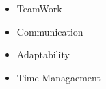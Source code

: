 \documentclass[a4paper,12pt]{article}
\begin{document}
\begin{minipage}[t]{0.5\textwidth}
    \begin{itemize}
        \item TeamWork
    \end{itemize}
\end{minipage}
\begin{minipage}[t]{0.5\textwidth}
    \begin{itemize}
        \item Communication
    \end{itemize}
\end{minipage}

\begin{minipage}[t]{0.5\textwidth}
    \begin{itemize}
        \item Adaptability
    \end{itemize}
\end{minipage}
\begin{minipage}[t]{0.5\textwidth}
    \begin{itemize}
        \item Time Managaement
    \end{itemize}
\end{minipage}




\vfill
\end{document}
